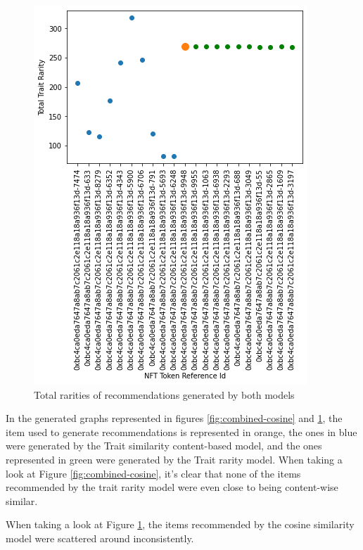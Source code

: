 \documentclass[conference]{IEEEtran}
\begin{document}
\begin{figure}[htbp]
\centerline{\includegraphics[width=\linewidth]{images/Total_rarities_content+rarity_based.png}}
\caption{Total rarities of recommendations generated by both models}
\label{fig:combined-rarity}
\end{figure}


In the generated graphs represented in figures \ref{fig:combined-cosine} and \ref{fig:combined-rarity}, the item used to generate recommendations is represented in orange, the ones in blue were generated by the Trait similarity content-based model, and the ones represented in green were generated by the Trait rarity model.
When taking a look at Figure \ref{fig:combined-cosine}, it's clear that none of the items recommended by the trait rarity model were even close to being content-wise similar.

When taking a look at Figure \ref{fig:combined-rarity}, the items recommended by the cosine similarity model were scattered around inconsistently.
\end{document}
